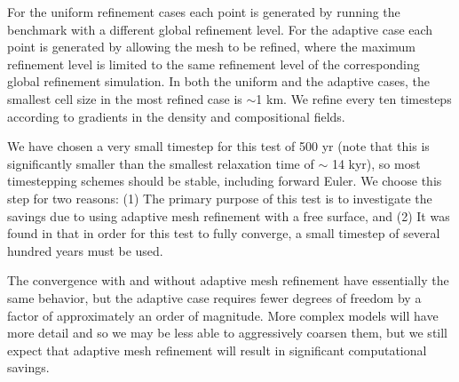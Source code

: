 \documentclass[preprint,12pt,authoryear]{elsarticle}
\begin{document}
For the uniform refinement cases each point is generated by running the benchmark with a different global refinement level.
For the adaptive case each point is generated by allowing the mesh to be refined, where the maximum refinement level
is limited to the same refinement level of the corresponding global refinement simulation.
In both the uniform and the adaptive cases, the smallest cell size in the most refined case is $\sim$1 km.
We refine every ten timesteps according to gradients in the density and compositional fields.

We have chosen a very small timestep for this test of 500 yr (note that this is significantly smaller than the smallest
relaxation time of $\sim$ 14 kyr), so most timestepping schemes should be stable, including forward Euler.
We choose this step for two reasons: (1) The primary purpose of this test is to investigate the savings
due to using adaptive mesh refinement with a free surface, and (2) It was found in \citet{crameri2012comparison}
that in order for this test to fully converge, a small timestep of several hundred years must be used.

The convergence with and without adaptive mesh refinement have essentially the same behavior, but the adaptive case requires 
fewer degrees of freedom by a factor of approximately an order of magnitude. More complex models will have
more detail and so we may be less able to aggressively coarsen them, but we still expect that adaptive mesh refinement 
will result in significant computational savings.
\end{document}

